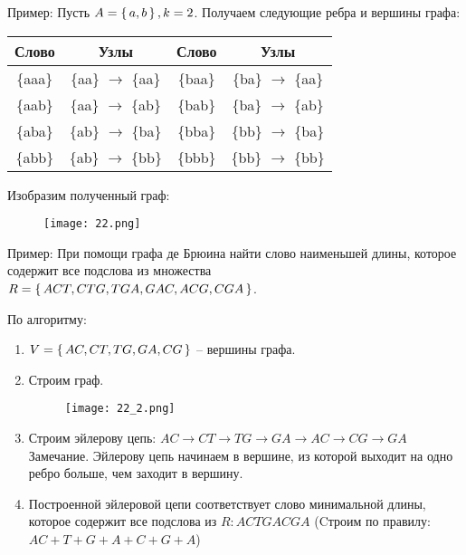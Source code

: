 Пример: Пусть $A=\set{a,b}, k=2$. Получаем следующие ребра и вершины графа:
\begin{table}[h!]
    \centering
    \begin{tabular}{|c|c||c|c|}
    \hline
    \textbf{Слово} & \textbf{Узлы} & \textbf{Слово} & \textbf{Узлы} \\
    \hline
    \{aaa\} & \{aa\} $\to$ \{aa\} & \{baa\} & \{ba\} $\to$ \{aa\} \\
    \{aab\} & \{aa\} $\to$ \{ab\} & \{bab\} & \{ba\} $\to$ \{ab\} \\
    \{aba\} & \{ab\} $\to$ \{ba\} & \{bba\} & \{bb\} $\to$ \{ba\} \\
    \{abb\} & \{ab\} $\to$ \{bb\} & \{bbb\} & \{bb\} $\to$ \{bb\} \\
    \hline
    \end{tabular}
\end{table}

Изобразим полученный граф:
\begin{figure}[h]
    \centering
    \texttt{[image: 22.png]}
\end{figure}

Пример: При помощи графа де Брюина найти слово наименьшей длины,
которое содержит все подслова из множества \\ 
$R=\set{ACT,CTG,TGA,GAC,ACG,CGA}$.

По алгоритму:
\begin{enumerate}[left=0.0em, labelsep=1em, topsep=0.0em, itemsep=0pt, parsep=0.5em]
    \item $V = \set{AC, CT, TG, GA, CG}$ -- вершины графа.
    \item Строим граф.
    \begin{figure}[h]
        \centering
        \texttt{[image: 22\_2.png]}
    \end{figure}
    \item Строим эйлерову цепь: $AC \to CT \to TG \to GA \to AC \to CG \to GA$
    Замечание. Эйлерову цепь начинаем в вершине, из которой выходит на
    одно ребро больше, чем заходит в вершину.
    \item Построенной эйлеровой цепи соответствует слово минимальной длины,
    которое содержит все подслова из $R: ACTGACGA$
    (Cтроим по правилу: $AC+T+G+A+C+G+A$)
\end{enumerate}

